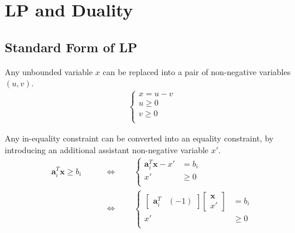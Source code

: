 \documentclass[twocolumn]{ctexart}
\begin{document}

\section{LP and Duality}

\subsection{Standard Form of LP}

Any unbounded variable $x$ can be replaced into a pair of non-negative variables $(u,v)$.
\begin{equation}
    \begin{aligned}
        \begin{cases}
            x = u - v \\
            u \geq 0  \\
            v \geq 0  \\
        \end{cases}
    \end{aligned}
\end{equation}

Any in-equality constraint can be converted into an equality constraint,
by introducing an additional assistant non-negative variable $x'$.
\begin{equation}
    \begin{aligned}
        \label{eq:}
        \mathbf{a}_i^T  \mathbf{x}  \geq  b_i
        & \qquad \Leftrightarrow \qquad
        \begin{cases}
            \mathbf{a}_i^T \mathbf{x}  -  x'  &=  b_i \\
            x' &\geq 0 \\
        \end{cases}
        \\
        & \qquad \Leftrightarrow \qquad
        \begin{cases}
            \begin{bmatrix} \mathbf{a}_i^T &  (-1) \end{bmatrix}
            \begin{bmatrix} \mathbf{x}     \\ x' \end{bmatrix}
            &= b_i
            \\
            x' &\geq 0 \\
        \end{cases}
    \end{aligned}
\end{equation}
\end{document}
